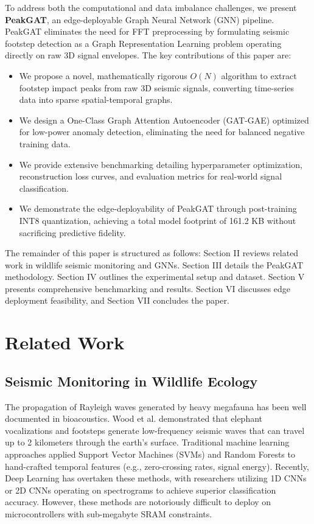 \documentclass[conference, a4paper]{IEEEtran}
\begin{document}
To address both the computational and data imbalance challenges, we present \textbf{PeakGAT}, an edge-deployable Graph Neural Network (GNN) pipeline. PeakGAT eliminates the need for FFT preprocessing by formulating seismic footstep detection as a Graph Representation Learning problem operating directly on raw 3D signal envelopes. The key contributions of this paper are:
\begin{itemize}
    \item We propose a novel, mathematically rigorous $O(N)$ algorithm to extract footstep impact peaks from raw 3D seismic signals, converting time-series data into sparse spatial-temporal graphs.
    \item We design a One-Class Graph Attention Autoencoder (GAT-GAE) optimized for low-power anomaly detection, eliminating the need for balanced negative training data.
    \item We provide extensive benchmarking detailing hyperparameter optimization, reconstruction loss curves, and evaluation metrics for real-world signal classification.
    \item We demonstrate the edge-deployability of PeakGAT through post-training INT8 quantization, achieving a total model footprint of 161.2 KB without sacrificing predictive fidelity.
\end{itemize}

The remainder of this paper is structured as follows: Section II reviews related work in wildlife seismic monitoring and GNNs. Section III details the PeakGAT methodology. Section IV outlines the experimental setup and dataset. Section V presents comprehensive benchmarking and results. Section VI discusses edge deployment feasibility, and Section VII concludes the paper.

\section{Related Work}
\subsection{Seismic Monitoring in Wildlife Ecology}
The propagation of Rayleigh waves generated by heavy megafauna has been well documented in bioacoustics. Wood et al. demonstrated that elephant vocalizations and footsteps generate low-frequency seismic waves that can travel up to 2 kilometers through the earth's surface. Traditional machine learning approaches applied Support Vector Machines (SVMs) and Random Forests to hand-crafted temporal features (e.g., zero-crossing rates, signal energy). Recently, Deep Learning has overtaken these methods, with researchers utilizing 1D CNNs or 2D CNNs operating on spectrograms to achieve superior classification accuracy. However, these methods are notoriously difficult to deploy on microcontrollers with sub-megabyte SRAM constraints.
\end{document}
